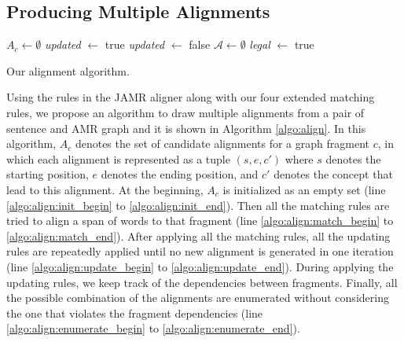 \documentclass[11pt,a4paper]{article}
\begin{document}
\subsection{Producing Multiple Alignments}
\begin{algorithm}[t]
	\small
	 {\label{algo:align:init_begin}
		$A_c \gets \emptyset$\;
	}\label{algo:align:init_end}
	\label{algo:align:match_end}
	{\it updated} $\gets$ \textsf{true} \;\label{algo:align:update_begin}
	 {
		{\it updated} $\gets$ \textsf{false}\;
		 {
			 {
			}
		}
	}\label{algo:align:update_end}
	$\mathcal{A} \gets \emptyset$ \;\label{algo:align:enumerate_begin}
	 {
		{\it legal} $\gets$ \textsf{true}\;
	}\label{algo:align:enumerate_end}
	\caption{Our alignment algorithm.}\label{algo:align}
\end{algorithm}

Using the rules in the JAMR aligner along with our four extended matching rules,
we propose an algorithm to draw multiple alignments 
from a pair of sentence and AMR graph and it is shown in Algorithm \ref{algo:align}.
In this algorithm, $A_c$ denotes the set of candidate alignments for a graph fragment $c$,
in which each alignment is represented as a tuple $(s, e, c')$
where $s$ denotes the starting position, $e$ denotes the ending position,
and $c'$ denotes the concept that lead to this alignment.
At the beginning, $A_c$ is initialized as an empty set (line \ref{algo:align:init_begin} to \ref{algo:align:init_end}).
Then all the matching rules are tried to align a span of words to that fragment
(line \ref{algo:align:match_begin} to \ref{algo:align:match_end}).
After applying all the matching rules, all the updating rules are repeatedly
applied until no new alignment is generated in one iteration (line \ref{algo:align:update_begin} to \ref{algo:align:update_end}).
During applying the updating rules, we keep track of the dependencies between fragments.
Finally, all the possible combination of the alignments
are enumerated without considering the one that violates the fragment dependencies
(line \ref{algo:align:enumerate_begin} to \ref{algo:align:enumerate_end}). 
\end{document}
